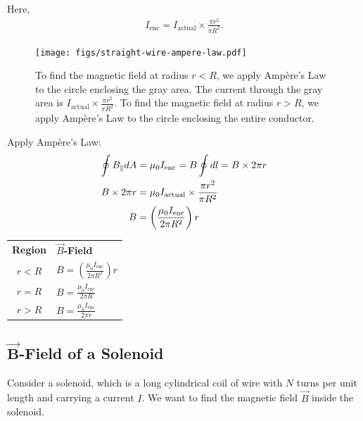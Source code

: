 \documentclass[12pt,b4paper]{article}
\begin{document}
Here,
\begin{align*}
    I_\text{enc}=I_\text{actual}\times\frac{\pi r^2}{\pi R^2}.
\end{align*}
\begin{figure}[H]
    \centering
    \texttt{[image: figs/straight-wire-ampere-law.pdf]}
    \caption{To find the magnetic field at radius $r<R$, we apply Ampère’s Law to the circle enclosing the gray area. The current through the gray area is $\displaystyle I_\text{actual}\times\frac{\pi r^2}{\pi R^2}$. To find the magnetic field at radius $r>R$, we apply Ampère’s Law to the circle enclosing the entire conductor.}
    \label{fig:straight-wire-ampere-law}
\end{figure}
Apply Ampère's Law:
\begin{align}
    \oint B_\parallel dA&=\mu_0 I_\text{enc}=B\oint dl=B\times 2\pi r\notag\\
    B\times 2\pi r&=\mu_0 I_\text{actual}\times\frac{\pi r^2}{\pi R^2}\notag\\
    B&=\left(\frac{\mu_0 I_\text{enc}}{2\pi R^2}\right)r
\end{align}
\begin{center}
\begin{tabular}{cl}
    \textbf{Region} & \textbf{$\vec{B}$-Field} \\[3pt]
    $r<R$ & $\displaystyle B=\left(\frac{\mu_0 I_\text{enc}}{2\pi R^2}\right)r$ \\[5pt]
    $r=R$ & $\displaystyle B=\frac{\mu_0 I_\text{enc}}{2\pi R}$ \\[8pt]
    $r>R$ & $\displaystyle B=\frac{\mu_0 I_\text{enc}}{2\pi r}$
\end{tabular}
\end{center}
\subsection{$\boldsymbol{\vec{B}}$-Field of a Solenoid}
Consider a solenoid, which is a long cylindrical coil of wire with $N$ turns per unit length and carrying a current $I$. We want to find the magnetic field $\vec{B}$ inside the solenoid.
\end{document}
